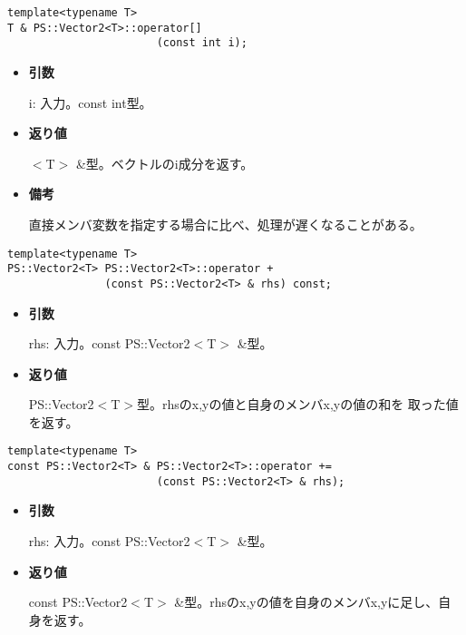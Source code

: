 \begin{screen}
\begin{verbatim}
template<typename T>
T & PS::Vector2<T>::operator[]
                       (const int i);
\end{verbatim}
\end{screen}

\begin{itemize}

\item{{\bf 引数}}

{i}: 入力。{const int}型。

\item{{\bf 返り値}}

{$<$T$>$ \&}型。ベクトルのi成分を返す。

\item{{\bf 備考}}

  直接メンバ変数を指定する場合に比べ、処理が遅くなることがある。

\end{itemize}


\begin{screen}
\begin{verbatim}
template<typename T>
PS::Vector2<T> PS::Vector2<T>::operator + 
               (const PS::Vector2<T> & rhs) const;
\end{verbatim}
\end{screen}

\begin{itemize}

\item{{\bf 引数}}

{rhs}: 入力。{const PS::Vector2$<$T$>$ \&}型。

\item{{\bf 返り値}}

{PS::Vector2$<$T$>$}型。{rhs}のx,yの値と自身のメンバx,yの値の和を
取った値を返す。

\end{itemize}

\begin{screen}
\begin{verbatim}
template<typename T>
const PS::Vector2<T> & PS::Vector2<T>::operator += 
                       (const PS::Vector2<T> & rhs);
\end{verbatim}
\end{screen}

\begin{itemize}

\item{{\bf 引数}}

{rhs}: 入力。{const PS::Vector2$<$T$>$ \&}型。

\item{{\bf 返り値}}

{const PS::Vector2$<$T$>$ \&}型。{rhs}のx,yの値を自身のメンバx,yに足し、自
身を返す。

\end{itemize}

